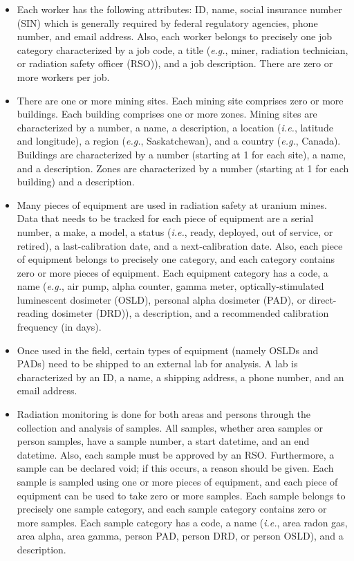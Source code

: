 \documentclass[12pt,a4paper]{article}
\begin{document}
\begin{itemize}
    \item Each worker has the following attributes: ID, name, social insurance number (SIN) which is generally required by federal regulatory agencies, phone number, and email address. Also, each worker belongs to precisely one job category characterized by a job code, a title (\textit{e.g.}, miner, radiation technician, or radiation safety officer (RSO)), and a job description. There are zero or more workers per job.
    \item There are one or more mining sites. Each mining site comprises zero or more buildings. Each building comprises one or more zones. Mining sites are characterized by a number, a name, a description, a location (\textit{i.e.}, latitude and longitude), a region (\textit{e.g.}, Saskatchewan), and a country (\textit{e.g.}, Canada). Buildings are characterized by a number (starting at 1 for each site), a name, and a description. Zones are characterized by a number (starting at 1 for each building) and a description.
    \item Many pieces of equipment are used in radiation safety at uranium mines. Data that needs to be tracked for each piece of equipment are a serial number, a make, a model, a status (\textit{i.e.}, ready, deployed, out of service, or retired), a last-calibration date, and a next-calibration date. Also, each piece of equipment belongs to precisely one category, and each category contains zero or more pieces of equipment. Each equipment category has a code, a name (\textit{e.g.}, air pump, alpha counter, gamma meter, optically-stimulated luminescent dosimeter (OSLD), personal alpha dosimeter (PAD), or direct-reading dosimeter (DRD)), a description, and a recommended calibration frequency (in days).
    \item Once used in the field, certain types of equipment (namely OSLDs and PADs) need to be shipped to an external lab for analysis. A lab is characterized by an ID, a name, a shipping address, a phone number, and an email address.
    \item Radiation monitoring is done for both areas and persons through the collection and analysis of samples. All samples, whether area samples or person samples, have a sample number, a start datetime, and an end datetime. Also, each sample must be approved by an RSO. Furthermore, a sample can be declared void; if this occurs, a reason should be given. Each sample is sampled using one or more pieces of equipment, and each piece of equipment can be used to take zero or more samples. Each sample belongs to precisely one sample category, and each sample category contains zero or more samples. Each sample category has a code, a name (\textit{i.e.}, area radon gas, area alpha, area gamma, person PAD, person DRD, or person OSLD), and a description.

\end{itemize}
\end{document}
